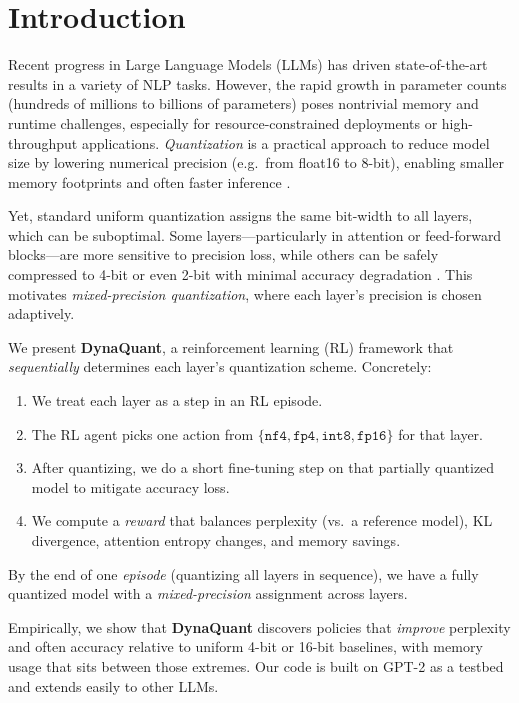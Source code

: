 \documentclass{article}
\begin{document}
	\section{Introduction}
	\label{sec:intro}
	Recent progress in Large Language Models (LLMs) has driven state-of-the-art results in a variety of NLP tasks. However, the rapid growth in parameter counts (hundreds of millions to billions of parameters) poses nontrivial memory and runtime challenges, especially for resource-constrained deployments or high-throughput applications. \emph{Quantization} is a practical approach to reduce model size by lowering numerical precision (e.g.\ from float16 to 8-bit), enabling smaller memory footprints and often faster inference \cite{dettmers2022llmint8,frantar2022gptq}.
	
	Yet, standard uniform quantization assigns the same bit-width to all layers, which can be suboptimal. Some layers—particularly in attention or feed-forward blocks—are more sensitive to precision loss, while others can be safely compressed to 4-bit or even 2-bit with minimal accuracy degradation \cite{dong2019hawq,dettmers2023qlora}. This motivates \emph{mixed-precision quantization}, where each layer’s precision is chosen adaptively.
	
	We present \textbf{DynaQuant}, a reinforcement learning (RL) framework that \emph{sequentially} determines each layer’s quantization scheme. Concretely:
	\begin{enumerate}
		\item We treat each layer as a step in an RL episode.
		\item The RL agent picks one action from $\{\texttt{nf4}, \texttt{fp4}, \texttt{int8}, \texttt{fp16}\}$ for that layer.
		\item After quantizing, we do a short fine-tuning step on that partially quantized model to mitigate accuracy loss.
		\item We compute a \emph{reward} that balances perplexity (vs.\ a reference model), KL divergence, attention entropy changes, and memory savings.
	\end{enumerate}
	By the end of one \emph{episode} (quantizing all layers in sequence), we have a fully quantized model with a \emph{mixed-precision} assignment across layers.
	
	Empirically, we show that \textbf{DynaQuant} discovers policies that \emph{improve} perplexity and often accuracy relative to uniform 4-bit or 16-bit baselines, with memory usage that sits between those extremes. Our code is built on GPT-2 as a testbed and extends easily to other LLMs.
	
\end{document}
